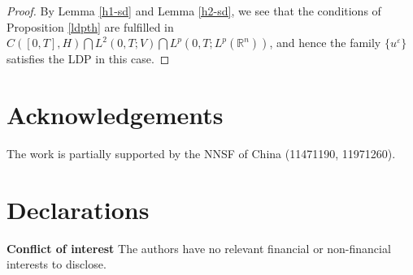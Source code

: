\documentclass[11pt]{article}
\numberwithin{equation}{section}
\theoremstyle{plain}
\begin{document}
 \begin{proof}
    By Lemma \ref{h1-sd}
    and  Lemma \ref{h2-sd},
    we see  that
    the conditions of Proposition \ref{ldpth} are fulfilled
    in
    $  C([0,T], H)  \bigcap  L^2(0,T; V) \bigcap L^p(0,T; L^p(\mathbb{R}^n ) ) $,
    and hence the family
    $\{ u^\varepsilon \}$
    satisfies the
    LDP in this case.
 \end{proof}


\section*{Acknowledgements}


 The work is partially supported by the NNSF of China (11471190, 11971260).


\section*{Declarations}

{\bf Conflict of interest}
 The authors have no relevant financial or non-financial interests to disclose.
\end{document}
